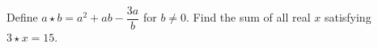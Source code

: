 Define $a\star b=a^2+ab-\dfrac{3a}{b}$ for $b\ne0$. Find the sum of all real $x$ satisfying $3\star x=15$.

